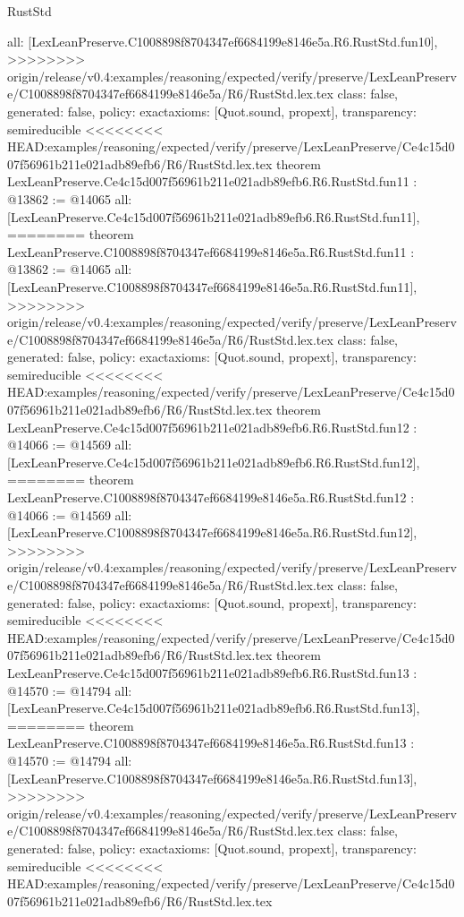 \begin{lexlean}{RustStd}
\begin{coremodule}
{\begin{coremodule}
{{{{{{{{{{{{{{  all: [LexLeanPreserve.C1008898f8704347ef6684199e8146e5a.R6.RustStd.fun10],
>>>>>>>> origin/release/v0.4:examples/reasoning/expected/verify/preserve/LexLeanPreserve/C1008898f8704347ef6684199e8146e5a/R6/RustStd.lex.tex
  class: false,
  generated: false,
  policy: exact{axioms: [Quot.sound, propext]},
  transparency: semireducible
}
<<<<<<<< HEAD:examples/reasoning/expected/verify/preserve/LexLeanPreserve/Ce4c15d007f56961b211e021adb89efb6/R6/RustStd.lex.tex
theorem LexLeanPreserve.Ce4c15d007f56961b211e021adb89efb6.R6.RustStd.fun11 : @13862 := @14065 {
  all: [LexLeanPreserve.Ce4c15d007f56961b211e021adb89efb6.R6.RustStd.fun11],
========
theorem LexLeanPreserve.C1008898f8704347ef6684199e8146e5a.R6.RustStd.fun11 : @13862 := @14065 {
  all: [LexLeanPreserve.C1008898f8704347ef6684199e8146e5a.R6.RustStd.fun11],
>>>>>>>> origin/release/v0.4:examples/reasoning/expected/verify/preserve/LexLeanPreserve/C1008898f8704347ef6684199e8146e5a/R6/RustStd.lex.tex
  class: false,
  generated: false,
  policy: exact{axioms: [Quot.sound, propext]},
  transparency: semireducible
}
<<<<<<<< HEAD:examples/reasoning/expected/verify/preserve/LexLeanPreserve/Ce4c15d007f56961b211e021adb89efb6/R6/RustStd.lex.tex
theorem LexLeanPreserve.Ce4c15d007f56961b211e021adb89efb6.R6.RustStd.fun12 : @14066 := @14569 {
  all: [LexLeanPreserve.Ce4c15d007f56961b211e021adb89efb6.R6.RustStd.fun12],
========
theorem LexLeanPreserve.C1008898f8704347ef6684199e8146e5a.R6.RustStd.fun12 : @14066 := @14569 {
  all: [LexLeanPreserve.C1008898f8704347ef6684199e8146e5a.R6.RustStd.fun12],
>>>>>>>> origin/release/v0.4:examples/reasoning/expected/verify/preserve/LexLeanPreserve/C1008898f8704347ef6684199e8146e5a/R6/RustStd.lex.tex
  class: false,
  generated: false,
  policy: exact{axioms: [Quot.sound, propext]},
  transparency: semireducible
}
<<<<<<<< HEAD:examples/reasoning/expected/verify/preserve/LexLeanPreserve/Ce4c15d007f56961b211e021adb89efb6/R6/RustStd.lex.tex
theorem LexLeanPreserve.Ce4c15d007f56961b211e021adb89efb6.R6.RustStd.fun13 : @14570 := @14794 {
  all: [LexLeanPreserve.Ce4c15d007f56961b211e021adb89efb6.R6.RustStd.fun13],
========
theorem LexLeanPreserve.C1008898f8704347ef6684199e8146e5a.R6.RustStd.fun13 : @14570 := @14794 {
  all: [LexLeanPreserve.C1008898f8704347ef6684199e8146e5a.R6.RustStd.fun13],
>>>>>>>> origin/release/v0.4:examples/reasoning/expected/verify/preserve/LexLeanPreserve/C1008898f8704347ef6684199e8146e5a/R6/RustStd.lex.tex
  class: false,
  generated: false,
  policy: exact{axioms: [Quot.sound, propext]},
  transparency: semireducible
}
<<<<<<<< HEAD:examples/reasoning/expected/verify/preserve/LexLeanPreserve/Ce4c15d007f56961b211e021adb89efb6/R6/RustStd.lex.tex
}}}}}}}}}}}}}}}}
\end{coremodule}}
\end{coremodule}
\end{lexlean}
